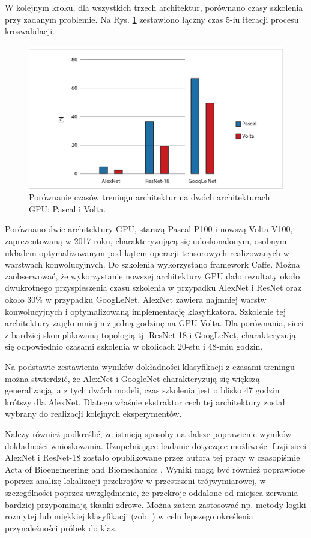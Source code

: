 W kolejnym kroku, dla wszystkich trzech architektur, porównano czasy szkolenia przy zadanym problemie. Na Rys. \ref{fig:training_times} zestawiono łączny czas 5-iu iteracji procesu kroswalidacji.
\begin{figure}[h!]
	\includegraphics[width=\textwidth]{figures/TrainingtimesChart.jpg}
	\caption{Porównanie czasów treningu architektur na dwóch architekturach GPU: Pascal i Volta.}
	\label{fig:training_times}
\end{figure}
Porównano dwie architektury GPU, starszą Pascal P100 i nowszą Volta V100, zaprezentowaną w 2017 roku, charakteryzującą się udoskonalonym, osobnym układem optymalizowanym pod kątem operacji tensorowych realizowanych \linebreak w warstwach konwolucyjnych. Do szkolenia wykorzystano framework Caffe. Można zaobserwować, że wykorzystanie nowszej architektury GPU dało rezultaty około dwukrotnego przyspieszenia czasu szkolenia w przypadku AlexNet i ResNet oraz około 30\% w przypadku GoogLeNet. AlexNet zawiera najmniej warstw konwolucyjnych i optymalizowaną implementację klasyfikatora. Szkolenie tej architektury zajęło mniej niż jedną godzinę na GPU Volta. Dla porównania, sieci z bardziej skomplikowaną topologią tj. ResNet-18 i GoogLeNet, charakteryzują się odpowiednio czasami szkolenia w okolicach 20-stu i 48-miu godzin. 

Na podstawie zestawienia wyników dokładności klasyfikacji z czasami treningu można stwierdzić, że AlexNet i GoogleNet charakteryzują się większą generalizacją, a z tych dwóch modeli, czas szkolenia jest o blisko 47 godzin krótszy dla AlexNet. Dlatego właśnie ekstraktor cech tej architektury został wybrany do realizacji kolejnych eksperymentów. 

Należy również podkreślić, że istnieją sposoby na dalsze poprawienie wyników dokładności wnioskowania. Uzupełniające badanie dotyczące możliwości fuzji sieci AlexNet i ResNet-18 zostało opublikowane przez autora tej pracy w czasopiśmie Acta of Bioengineering and Biomechanics \cite{Kapinski19}. Wyniki mogą być również poprawione poprzez analizę lokalizacji przekrojów w przestrzeni trójwymiarowej, w szczególności poprzez uwzględnienie, że przekroje oddalone od miejsca zerwania bardziej przypominają tkanki zdrowe. Można zatem zastosować np. metody logiki rozmytej lub miękkiej klasyfikacji (zob. \cite{Liu2011}) w celu lepszego określenia przynależności próbek do klas. 

